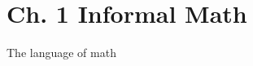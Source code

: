 \documentclass[11pt]{article}
\begin{document}
\section*{Ch. 1 Informal Math}

The language of math
\end{document}
